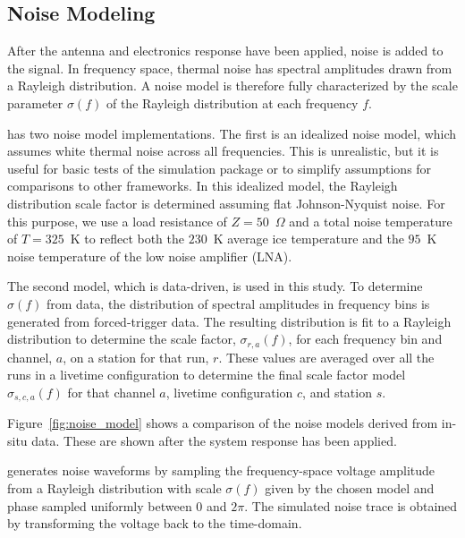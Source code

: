         \subsection{Noise Modeling}

            After the antenna and electronics response have been applied, noise is added to the signal.
            In frequency space, thermal noise has spectral amplitudes drawn from a Rayleigh distribution.
            A noise model is therefore fully characterized by the scale parameter $\sigma(f)$ of the Rayleigh distribution at each frequency $f$.
            
            \arasim{} has two noise model implementations.
            The first is an idealized noise model,  
            which assumes white thermal noise across all frequencies.
            This is unrealistic, but it is useful for basic tests 
            of the simulation package or 
            to simplify assumptions for comparisons to other frameworks.
            In this idealized model, the Rayleigh distribution scale factor is determined assuming flat Johnson-Nyquist noise.
            For this purpose, we use a load resistance of $Z=50$~$\Omega$ and a total noise temperature of $T=325$~K to reflect both the $230$~K average ice temperature and the $95$~K noise temperature of the low noise amplifier (LNA).

            The second model, which is data-driven, is used in this study.
            To determine $\sigma(f)$ from data, the distribution of spectral amplitudes in frequency bins is generated from forced-trigger data.
            The resulting distribution is fit to a Rayleigh distribution to determine the scale factor, $\sigma_{r,a}(f)$, for each frequency bin and channel, $a$, on a station for that run, $r$.
            These values are averaged over all the runs in a livetime configuration to determine the final scale factor model $\sigma_{s,c,a}(f)$ for that channel $a$, livetime configuration $c$, and station $s$.
            
            Figure~\ref{fig:noise_model} shows a comparison of the noise models derived from in-situ data.
            These are shown after the system response has been applied.

            \arasim{} generates noise waveforms by sampling the frequency-space voltage amplitude from a Rayleigh distribution with scale $\sigma(f)$ given by the chosen model and phase sampled uniformly between $0$ and $2\pi$.
            The simulated noise trace is obtained by transforming the voltage back to the time-domain.
        
